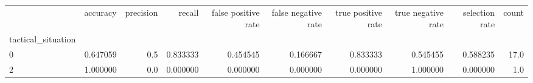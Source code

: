 \begin{tabular}{lrrrrrrrrr}
\toprule
{} &  accuracy &  precision &    recall &  false positive rate &  false negative rate &  true positive rate &  true negative rate &  selection rate &  count \\
tactical\_situation &           &            &           &                      &                      &                     &                     &                 &        \\
\midrule
0                  &  0.647059 &        0.5 &  0.833333 &             0.454545 &             0.166667 &            0.833333 &            0.545455 &        0.588235 &   17.0 \\
2                  &  1.000000 &        0.0 &  0.000000 &             0.000000 &             0.000000 &            0.000000 &            1.000000 &        0.000000 &    1.0 \\
\bottomrule
\end{tabular}
